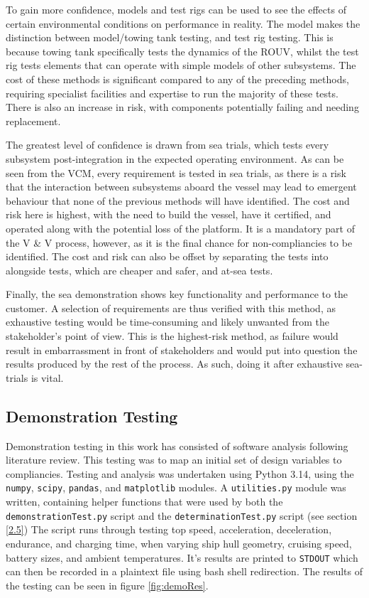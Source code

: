 \documentclass[../main.tex]{subfiles}
\begin{document}
To gain more confidence, models and test rigs can be used to see the effects of certain environmental conditions on performance in reality.
The model makes the distinction between model/towing tank testing, and test rig testing.
This is because towing tank specifically tests the dynamics of the ROUV, whilst the test rig tests elements that can operate with simple models of other subsystems.
The cost of these methods is significant compared to any of the preceding methods, requiring specialist facilities and expertise to run the majority of these tests.
There is also an increase in risk, with components potentially failing and needing replacement.

The greatest level of confidence is drawn from sea trials, which tests every subsystem post-integration in the expected operating environment.
As can be seen from the VCM, every requirement is tested in sea trials, as there is a risk that the interaction between subsystems aboard the vessel may lead to emergent behaviour that none of the previous methods will have identified.
The cost and risk here is highest, with the need to build the vessel, have it certified, and operated along with the potential loss of the platform.
It is a mandatory part of the V \& V process, however, as it is the final chance for non-compliancies to be identified.
The cost and risk can also be offset by separating the tests into alongside tests, which are cheaper and safer, and at-sea tests.

Finally, the sea demonstration shows key functionality and performance to the customer.
A selection of requirements are thus verified with this method, as exhaustive testing would be time-consuming and likely unwanted from the stakeholder's point of view.
This is the highest-risk method, as failure would result in embarrassment in front of stakeholders and would put into question the results produced by the rest of the process.
As such, doing it after exhaustive sea-trials is vital.

\subsection{Demonstration Testing}\label{2.4}

Demonstration testing in this work has consisted of software analysis following literature review.
This testing was to map an initial set of design variables to compliancies.
Testing and analysis was undertaken using Python 3.14, using the \texttt{numpy}, \texttt{scipy}, \texttt{pandas}, and \texttt{matplotlib} modules.
A \texttt{utilities.py} module was written, containing helper functions that were used by both the \texttt{demonstrationTest.py} script and the \texttt{determinationTest.py} script (see section \ref{2.5})
The script runs through testing top speed, acceleration, deceleration, endurance, and charging time, when varying ship hull geometry, cruising speed, battery sizes, and ambient temperatures.
It's results are printed to \texttt{STDOUT} which can then be recorded in a plaintext file using bash shell redirection.
The results of the testing can be seen in figure \ref{fig:demoRes}.
\end{document}
